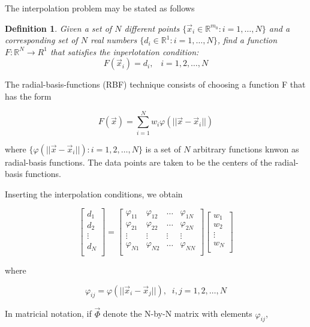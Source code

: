 \documentclass{article}
\newtheorem{definition}{Definition}[section]
\begin{document}
The interpolation problem may be stated as follows

\begin{definition}
	Given a set of $ N $ different points $ \{ \vec{x}_{i} \in \mathbb{R}^{m_{0}} : i = 1, \ldots, N \} $ and a corresponding set of $ N $ real numbers $ \{ d_{i} \in \mathbb{R}^{1} : i = 1, \ldots, N \} $, find a function $ F: \mathbb{R}^{N} \rightarrow R^{1} $ that satisfies the inperlotation condition:
	$$ F ( \vec{x}_{i}) = d_{i}, \;\;\; i = 1, 2, \ldots, N $$
\end{definition}

The radial-basis-functions (RBF) technique consists of choosing a function F that has the form

$$ F ( \vec{x}) = \sum^{N}_{i=1} w_{i} \varphi ( || \vec{x} - \vec{x}_{i} ||) $$

\noindent where $ \{ \varphi (|| \vec{x} - \vec{x}_{i} || ): i = 1, 2, \ldots, N \} $ is a set of $ N $ arbitrary functions knwon as radial-basis functions. The data points are taken to be the centers of the radial-basis functions.

Inserting the interpolation conditions, we obtain

$$ 
\begin{bmatrix}
	d_{1} \\
	d_{2} \\
	\vdots \\
	d_{N} \\
\end{bmatrix}
=
\begin{bmatrix}
	\varphi_{11} & \varphi_{12} & \ldots  & \varphi_{1N} \\
	\varphi_{21} & \varphi_{22} & \ldots & \varphi_{2N} \\
	\vdots & \vdots & \vdots & \vdots \\
	\varphi_{N1} & \varphi_{N2} & \ldots & \varphi_{NN} \\
\end{bmatrix}
\begin{bmatrix}
	w_{1} \\
	w_{2} \\
	\vdots \\
	w_{N} \\
\end{bmatrix}
$$

\noindent where

$$ \varphi_{ij} = \varphi ( || \vec{x}_{i} - \vec{x}_{j} ||), \;\; i,j = 1, 2, \ldots, N$$

In matricial notation, if $ \vec{\Phi} $ denote the N-by-N matrix with elements $ \varphi_{ij} $,
\end{document}
